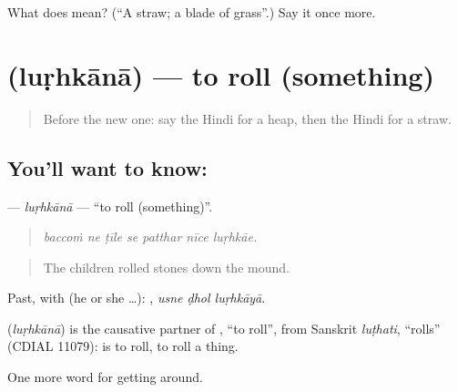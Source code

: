 \begin{tcolorbox}[breakable,colback=teal!4,colframe=teal!35!black,title={Before you move on}]
What does  mean? (\textquotedblleft{}A straw; a blade of grass\textquotedblright{}.) Say it once more.
\end{tcolorbox}
\section[\texorpdfstring{\hi{लुढ़काना} (luṛhkānā)}{लुढ़काना (luṛhkānā)}]{ (luṛhkānā) — to roll (something)}

\label{lesson:HI-C442-lurhkana}



\begin{quote}
Before the new one: say the Hindi for a heap, then the Hindi for a straw.
\end{quote}

\subsection*{You'll want to know: }
\textbf{} — \emph{luṛhkānā} — \textquotedblleft{}to roll (something)\textquotedblright{}.

\begin{quote}
      
\end{quote}

\begin{quote}
\emph{baccoṁ ne ṭīle se patthar nīce luṛhkāe.}
\end{quote}

\begin{quote}
The children rolled stones down the mound.
\end{quote}

Past, with  (he or she …):   , \emph{usne ḍhol luṛhkāyā}.

\begin{cousinweb}
\textbf{} (\emph{luṛhkānā}) is the causative partner of , \textquotedblleft{}to roll\textquotedblright{}, from Sanskrit \emph{luṭhati}, \textquotedblleft{}rolls\textquotedblright{} (CDIAL 11079):  is to roll,  to roll a thing.
\end{cousinweb}

\begin{grammarlens}[title={What you've built}]
One more word for getting around.
\end{grammarlens}


